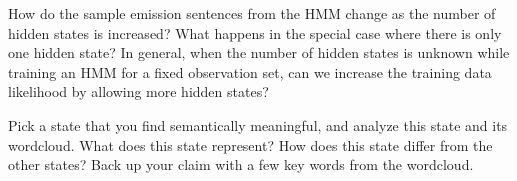 \indent\problem[5] %
How do the sample emission sentences from the HMM change as the number of hidden states is increased? What happens in the special case where there is only one hidden state? In general, when the number of hidden states is unknown while training an HMM for a fixed observation set, can we increase the training data likelihood by allowing more hidden states?

\begin{solution}
\end{solution}


\indent\problem[5] %
Pick a state that you find semantically meaningful, and analyze this state and its wordcloud. What does this state represent? How does this state differ from the other states? Back up your claim with a few key words from the wordcloud.
\begin{solution}
\end{solution}


